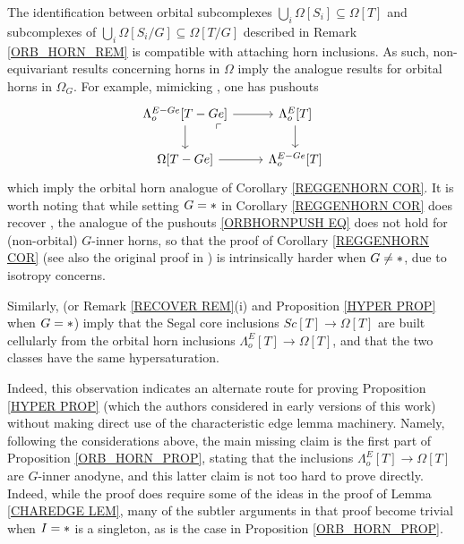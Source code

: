 \documentclass[a4paper,10pt
,draft
]{article}%
\begin{document}
\begin{remark}
	The identification between orbital subcomplexes 
	$\bigcup_i \Omega[S_i] \subseteq \Omega[T]$ and subcomplexes of 
	$\bigcup_i \Omega[S_i/G] \subseteq \Omega[T/G]$
	described in Remark \ref{ORB_HORN_REM}
	is compatible with attaching horn inclusions.
	As such, non-equivariant results concerning horns in $\Omega$
	imply the analogue results for orbital horns in $\Omega_G$. For example, mimicking \cite[Lemma 5.1]{MW09}, one has pushouts	
\begin{equation}\label{ORBHORNPUSH EQ}
\begin{tikzcd}
	\Lambda^{E - G e}_o[T - Ge] \arrow[r] \arrow[d]
	\arrow[dr, phantom, "\ulcorner", very near start] &
	\Lambda^{E}_o[T] \arrow[d]
\\
	\Omega[T - G e] \arrow[r]&
	\Lambda^{E - G e}_o[T]
\end{tikzcd}
\end{equation}	
which imply the orbital horn analogue of 
Corollary \ref{REGGENHORN COR}.
It is worth noting that while setting $G=\**$ in 
Corollary \ref{REGGENHORN COR} does recover
\cite[Lemma 5.1]{MW09}, 
the analogue of the pushouts \eqref{ORBHORNPUSH EQ}
does not hold for (non-orbital) $G$-inner horns,
so that the proof of Corollary \ref{REGGENHORN COR}
(see also the original proof in \cite[Prop. 6.17]{Per17})
is intrinsically harder when $G \neq \**$,
due to isotropy concerns.

Similarly, \cite[Props. 2.4 and 2.5]{CM13a} 
(or Remark \ref{RECOVER REM}(i) and Proposition \ref{HYPER PROP} when $G=\**$)
imply that the Segal core inclusions 
$Sc[T] \to \Omega[T]$
are built cellularly from the orbital horn inclusions
$\Lambda^E_o[T] \to \Omega[T]$, and that the two classes have the same hypersaturation. 

	Indeed, this observation indicates an alternate route for proving Proposition \ref{HYPER PROP}
	(which the authors considered in early versions of this work)
	without making direct use of the characteristic edge lemma machinery.
	Namely, following the considerations above, the main missing claim is the first part of Proposition \ref{ORB_HORN_PROP}, stating that the inclusions
	$\Lambda^E_o[T] \to \Omega[T]$ are $G$-inner anodyne, and this latter claim is not too hard to prove directly. 
	Indeed, while the proof does require some of the ideas in the proof of Lemma \ref{CHAREDGE LEM},
	many of the subtler arguments in that proof
	become trivial when $I=\**$ is a singleton, as is the case in Proposition \ref{ORB_HORN_PROP}.
\end{remark}
\end{document}

